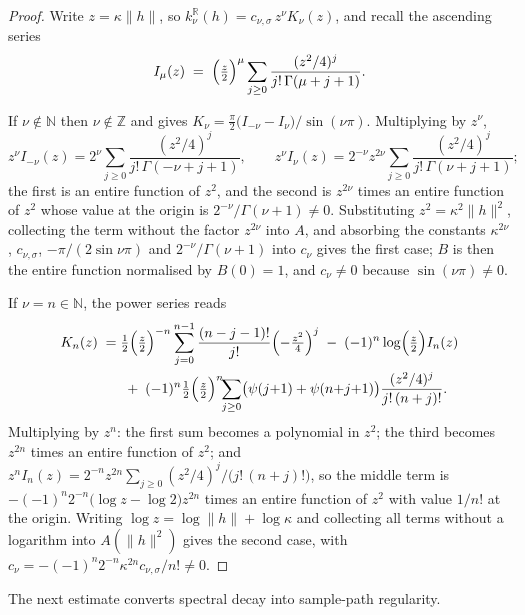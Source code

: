 \documentclass[pdflatex,sn-mathphys,Numbered]{sn-jnl}
\theoremstyle{thmstyleone}%
\theoremstyle{thmstyletwo}%
\theoremstyle{thmstylethree}%
\newcommand{\RR}{\mathbb{R}}
\newcommand{\ZZ}{\mathbb{Z}}
\newcommand{\NN}{\mathbb{N}}
\begin{document}
\begin{appendices}
\begin{proof}
Write $z = \kappa\|h\|$, so $k^{\RR}_\nu(h) = c_{\nu,\sigma}\,z^{\nu}K_\nu(z)$,
and recall the ascending series \cite[Eq.~10.25.2]{dlmf}
\[
    I_\mu(z) \;=\; \Bigl(\tfrac z2\Bigr)^{\mu}
        \sum_{j\geq0}\frac{(z^2/4)^{j}}{j!\,\Gamma(\mu+j+1)} .
\]

If $\nu \notin \NN$ then $\nu \notin \ZZ$ and \cite[Eq.~10.27.4]{dlmf} gives
$K_\nu = \tfrac{\pi}{2}\bigl(I_{-\nu}-I_\nu\bigr)/\sin(\nu\pi)$. Multiplying by
$z^{\nu}$,
\[
    z^{\nu}I_{-\nu}(z) = 2^{\nu}\sum_{j\geq0}
        \frac{(z^2/4)^{j}}{j!\,\Gamma(-\nu+j+1)} , \qquad
    z^{\nu}I_{\nu}(z) = 2^{-\nu}z^{2\nu}\sum_{j\geq0}
        \frac{(z^2/4)^{j}}{j!\,\Gamma(\nu+j+1)} ;
\]
the first is an entire function of $z^2$, and the second is $z^{2\nu}$ times an
entire function of $z^2$ whose value at the origin is
$2^{-\nu}/\Gamma(\nu+1) \neq 0$. Substituting $z^2 = \kappa^2\|h\|^2$, collecting the term without the factor
$z^{2\nu}$ into $A$, and absorbing the constants $\kappa^{2\nu}$,
$c_{\nu,\sigma}$, $-\pi/(2\sin\nu\pi)$ and $2^{-\nu}/\Gamma(\nu+1)$ into $c_\nu$
gives the first case; $B$ is then the entire function normalised by $B(0)=1$,
and $c_\nu \neq 0$ because $\sin(\nu\pi)\neq0$.

If $\nu = n \in \NN$, the power series \cite[Eq.~10.31.1]{dlmf} reads
\begin{align*}
    K_n(z) \;=\;& \tfrac12\Bigl(\tfrac z2\Bigr)^{-n}
        \sum_{j=0}^{n-1}\frac{(n-j-1)!}{j!}\Bigl(-\tfrac{z^2}{4}\Bigr)^{j}
      \;-\;(-1)^{n}\log\Bigl(\tfrac z2\Bigr) I_n(z) \\
      &\;+\;(-1)^{n}\tfrac12\Bigl(\tfrac z2\Bigr)^{n}\!\!
        \sum_{j\geq0}\bigl(\psi(j{+}1)+\psi(n{+}j{+}1)\bigr)
        \frac{(z^2/4)^{j}}{j!\,(n+j)!} .
\end{align*}
Multiplying by $z^{n}$: the first sum becomes a polynomial in $z^2$; the third
becomes $z^{2n}$ times an entire function of $z^2$; and
$z^{n}I_n(z) = 2^{-n}z^{2n}\sum_{j\geq0}(z^2/4)^{j}/\bigl(j!\,(n+j)!\bigr)$, so
the middle term is $-(-1)^{n}2^{-n}\bigl(\log z - \log 2\bigr)z^{2n}$ times an
entire function of $z^2$ with value $1/n!$ at the origin. Writing
$\log z = \log\|h\| + \log\kappa$ and collecting all terms without a logarithm
into $A(\|h\|^2)$ gives the second case, with
$c_\nu = -(-1)^{n}2^{-n}\kappa^{2n}c_{\nu,\sigma}/n! \neq 0$.
\end{proof}

The next estimate converts spectral decay into sample-path regularity.


\end{appendices}
\end{document}
